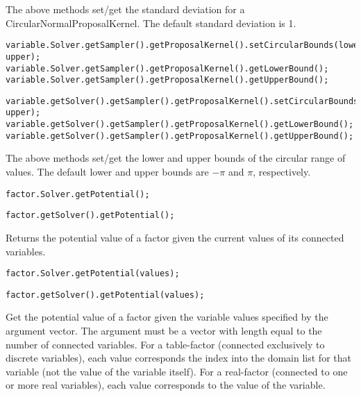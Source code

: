 The above methods set/get the standard deviation for a CircularNormalProposalKernel.  The default standard deviation is 1.

\ifmatlab
\begin{lstlisting}
variable.Solver.getSampler().getProposalKernel().setCircularBounds(lower, upper);
variable.Solver.getSampler().getProposalKernel().getLowerBound();
variable.Solver.getSampler().getProposalKernel().getUpperBound();
\end{lstlisting}
\fi

\ifjava
\begin{lstlisting}
variable.getSolver().getSampler().getProposalKernel().setCircularBounds(lower, upper);
variable.getSolver().getSampler().getProposalKernel().getLowerBound();
variable.getSolver().getSampler().getProposalKernel().getUpperBound();
\end{lstlisting}
\fi

The above methods set/get the lower and upper bounds of the circular range of values.  The default lower and upper bounds are $-\pi$ and $\pi$, respectively.



\ifmatlab
\begin{lstlisting}
factor.Solver.getPotential();
\end{lstlisting}
\fi

\ifjava
\begin{lstlisting}
factor.getSolver().getPotential();
\end{lstlisting}
\fi

Returns the potential value of a factor given the current values of its connected variables.

\ifmatlab
\begin{lstlisting}
factor.Solver.getPotential(values);
\end{lstlisting}
\fi

\ifjava
\begin{lstlisting}
factor.getSolver().getPotential(values);
\end{lstlisting}
\fi

Get the potential value of a factor given the variable values specified by the argument vector. The argument must be a vector with length equal to the number of connected variables. For a table-factor (connected exclusively to discrete variables), each value corresponds the index into the domain list for that variable (not the value of the variable itself). For a real-factor (connected to one or more real variables), each value corresponds to the value of the variable.

